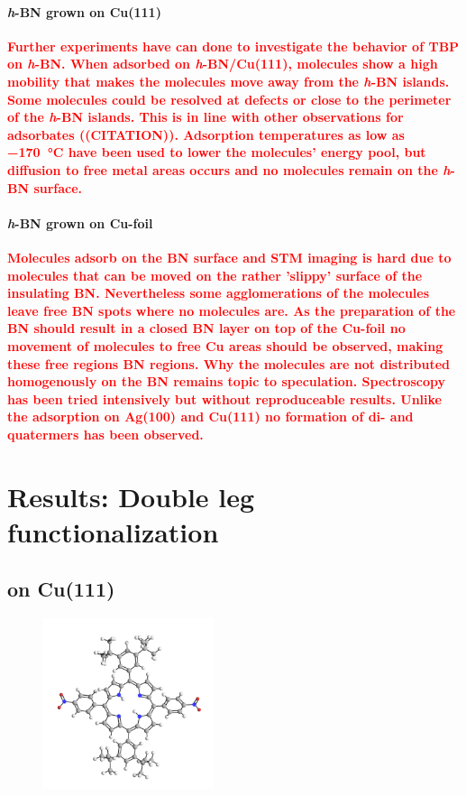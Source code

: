	\paragraph{\textit{h}-BN grown on Cu(111)}
	\textcolor{red}{\textbf{
			Further experiments have can done to investigate the behavior of TBP on \textit{h}-BN. When adsorbed on \textit{h}-BN/Cu(111), molecules show a high mobility that makes the molecules move away from the \textit{h}-BN islands. Some molecules could be resolved at defects or close to the perimeter of the \textit{h}-BN islands. This is in line with other observations for adsorbates ((CITATION)). Adsorption temperatures as low as \SI{-170}{\celsius} have been used to lower the molecules' energy pool, but diffusion to free metal areas occurs and no molecules remain on the \textit{h}-BN surface.
		}}
		
		\paragraph{\textit{h}-BN grown on Cu-foil}
		\textcolor{red}{\textbf{
				Molecules adsorb on the BN surface and STM imaging is hard due to molecules that can be moved on the rather 'slippy' surface of the insulating BN. Nevertheless some agglomerations of the molecules leave free BN spots where no molecules are. As the preparation of the BN should result in a closed BN layer on top of the Cu-foil no movement of molecules to free Cu areas should be observed, making these free regions BN regions.
				Why the molecules are not distributed homogenously on the BN remains topic to speculation.
				Spectroscopy has been tried intensively but without reproduceable results.
				Unlike the adsorption on Ag(100) and Cu(111) no formation of di- and quatermers has been observed.
			}}

\section{Results: Double leg functionalization}
	\subsection{on Cu(111)}
	\begin{figure}\centering
		\includegraphics[angle=90, width=5cm]{./images/molecules/max-zoom/TBP-trans-600}
		\caption{}
	\end{figure}
	
